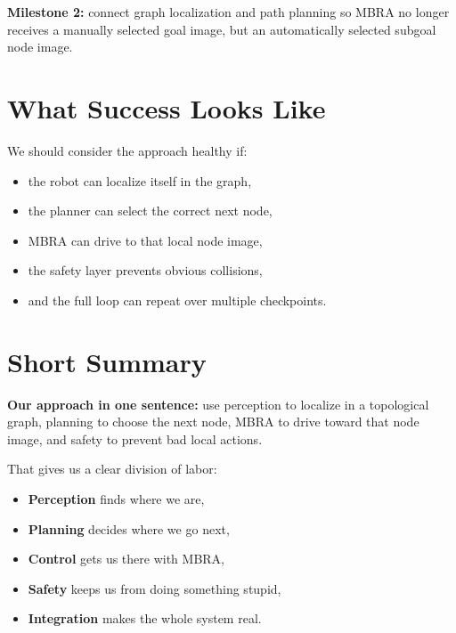 \documentclass[11pt,a4paper]{article}
\begin{document}
\begin{mdframed}
\textbf{Milestone 2:} connect graph localization and path planning so MBRA no
longer receives a manually selected goal image, but an automatically selected
subgoal node image.
\end{mdframed}


\section{What Success Looks Like}

We should consider the approach healthy if:
\begin{itemize}[nosep]
  \item the robot can localize itself in the graph,
  \item the planner can select the correct next node,
  \item MBRA can drive to that local node image,
  \item the safety layer prevents obvious collisions,
  \item and the full loop can repeat over multiple checkpoints.
\end{itemize}


\section{Short Summary}

\begin{mdframed}
\textbf{Our approach in one sentence:} use perception to localize in a
topological graph, planning to choose the next node, MBRA to drive toward that
node image, and safety to prevent bad local actions.
\end{mdframed}

That gives us a clear division of labor:
\begin{itemize}[nosep]
  \item \textbf{Perception} finds where we are,
  \item \textbf{Planning} decides where we go next,
  \item \textbf{Control} gets us there with MBRA,
  \item \textbf{Safety} keeps us from doing something stupid,
  \item \textbf{Integration} makes the whole system real.
\end{itemize}
\end{document}
